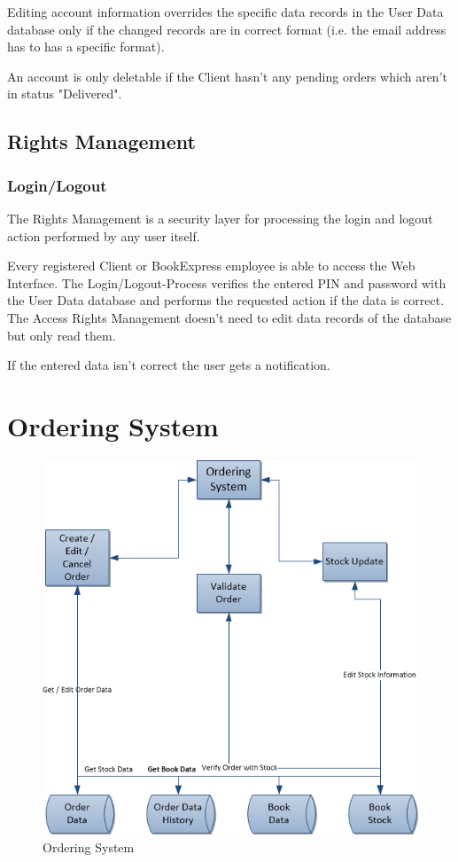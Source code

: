 \documentclass[11pt,a4paper,oneside,svgnames]{report}
\begin{document}
Editing account information overrides the specific data records in the User Data database only if the changed records are in correct format (i.e. the email address has to has a specific format).

An account is only deletable if the Client hasn't any pending orders which aren't in status "Delivered".

\subsection{Rights Management}

\subsubsection{Login/Logout}

The Rights Management is a security layer for processing the login and logout action performed by any user itself.

Every registered Client or BookExpress employee is able to access the Web Interface. The Login/Logout-Process verifies the entered PIN and password with the User Data database and performs the requested action if the data is correct. The Access Rights Management doesn't need to edit data records of the database but only read them.

If the entered data isn't correct the user gets a notification.

\section{Ordering System}

\begin{figure}[H]
 \begin{center}
  \includegraphics[width=\textwidth]{OrderingSystem.png}
 \end{center}
 \caption{Ordering System}
\end{figure}
\end{document}
